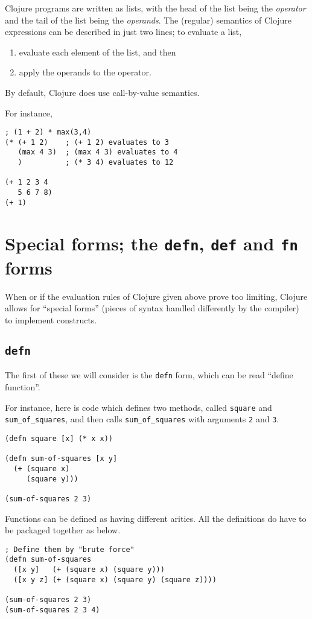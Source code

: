 \documentclass[11pt]{article}
\begin{document}
Clojure programs are written as lists,
with the head of the list being the \emph{operator} and
the tail of the list being the \emph{operands}.
The (regular) semantics of Clojure expressions
can be described in just two lines;
to evaluate a list,
\begin{enumerate}
\item evaluate each element of the list, and then
\item apply the operands to the operator.
\end{enumerate}
By default, Clojure does use call-by-value semantics.

For instance,
\begin{verbatim}
; (1 + 2) * max(3,4)
(* (+ 1 2)    ; (+ 1 2) evaluates to 3
   (max 4 3)  ; (max 4 3) evaluates to 4
   )          ; (* 3 4) evaluates to 12

(+ 1 2 3 4
   5 6 7 8)
(+ 1)
\end{verbatim}

\section{Special forms; the \texttt{defn}, \texttt{def} and \texttt{fn} forms}
\label{sec:orgf17a192}
When or if the evaluation rules of Clojure given above
prove too limiting, Clojure allows for “special forms”
(pieces of syntax handled differently by the compiler)
to implement constructs.

\subsection{\texttt{defn}}
\label{sec:org647e2cc}
The first of these we will consider is the \texttt{defn} form,
which can be read “define function”.

For instance, here is code which defines two methods,
called \texttt{square} and \texttt{sum\_of\_squares},
and then calls \texttt{sum\_of\_squares} with arguments \texttt{2} and \texttt{3}.
\begin{verbatim}
(defn square [x] (* x x))

(defn sum-of-squares [x y]
  (+ (square x)
     (square y)))

(sum-of-squares 2 3)
\end{verbatim}

Functions can be defined as having different arities.
All the definitions do have to be packaged together as below.
\begin{verbatim}
; Define them by "brute force" 
(defn sum-of-squares
  ([x y]   (+ (square x) (square y)))
  ([x y z] (+ (square x) (square y) (square z))))

(sum-of-squares 2 3)
(sum-of-squares 2 3 4)
\end{verbatim}
\end{document}
